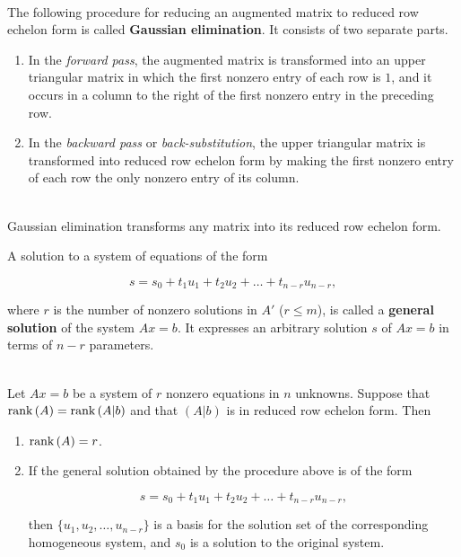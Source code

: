 \begin{definition}
	\hfill\\
	The following procedure for reducing an augmented matrix to reduced row echelon form is called \textbf{Gaussian elimination}. It consists of two separate parts.
	
	\begin{enumerate}
		\item In the \textit{forward pass}, the augmented matrix is transformed into an upper triangular matrix in which the first nonzero entry of each row is $1$, and it occurs in a column to the right of the first nonzero entry in the preceding row.
		
		\item In the \textit{backward pass} or \textit{back-substitution}, the upper triangular matrix is transformed into reduced row echelon form by making the first nonzero entry of each row the only nonzero entry of its column.
	\end{enumerate}
\end{definition}

\begin{theorem}
	\hfill\\
	Gaussian elimination transforms any matrix into its reduced row echelon form.
\end{theorem}

\begin{definition}
	A solution to a system of equations of the form
	
	\[s = s_0 + t_1u_1 + t_2u_2 + \dots +t_{n-r}u_{n-r},\]
	
	where $r$ is the number of nonzero solutions in $A'$ ($r \leq m$), is called a \textbf{general solution} of the system $Ax = b$. It expresses an arbitrary solution $s$ of $Ax = b$ in terms of $n - r$ parameters.
\end{definition}

\begin{theorem}
	\hfill\\
	Let $Ax = b$ be a system of $r$ nonzero equations in $n$ unknowns. Suppose that $\text{rank}\left(A\right) = \text{rank}\left(A|b\right)$ and that $(A|b)$ is in reduced row echelon form. Then
	
	\begin{enumerate}
		\item $\text{rank}\left(A\right) = r$.
		\item If the general solution obtained by the procedure above is of the form
		
		\[s = s_0 + t_1u_1 + t_2u_2 + \dots + t_{n-r}u_{n-r},\]
		
		then $\{u_1, u_2, \dots, u_{n-r}\}$ is a basis for the solution set of the corresponding homogeneous system, and $s_0$ is a solution to the original system.
	\end{enumerate}
\end{theorem}

